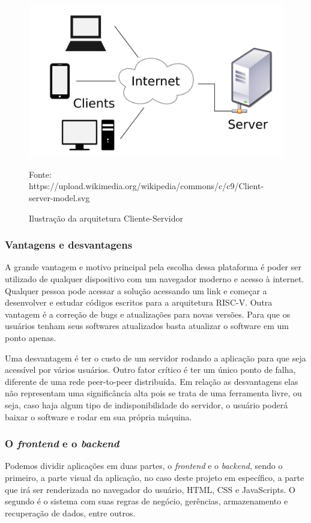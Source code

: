 		\begin{figure}
		  \includegraphics[width=\linewidth]{img/client-server-model.png}
		  \caption{Ilustração da arquitetura Cliente-Servidor}
		  Fonte: https://upload.wikimedia.org/wikipedia/commons/c/c9/Client-server-model.svg
		  \label{fig:client-server-model}
		\end{figure}

		\subsubsection{Vantagens e desvantagens}

			A grande vantagem e motivo principal pela escolha dessa plataforma é poder ser utilizado de qualquer dispositivo com um navegador moderno e acesso à internet. Qualquer pessoa pode acessar a solução acessando um link e começar a desenvolver e estudar códigos escritos para a arquitetura RISC-V. 
			Outra vantagem é a correção de bugs e atualizações para novas versões. Para que os usuários tenham seus softwares atualizados basta atualizar o software em um ponto apenas.

			Uma desvantagem é ter o custo de um servidor rodando a aplicação para que seja acessível por vários usuários. Outro fator crítico é ter um único ponto de falha, diferente de uma rede peer-to-peer distribuída.
			Em relação as desvantagens elas não representam uma significância alta pois se trata de uma ferramenta livre, ou seja, caso haja algum tipo de indisponibilidade do servidor, o usuário poderá baixar o software e rodar em sua própria máquina. 


		
		\subsubsection{O \textit{frontend} e o \textit{backend}}
			Podemos dividir aplicações em duas partes, o \textit{frontend} e o \textit{backend}, sendo o primeiro, a parte visual da aplicação, no caso deste projeto em específico, a parte que irá ser renderizada no navegador do usuário, HTML, CSS e JavaScripts. O segundo é o sistema com suas regras de negócio, gerências, armazenamento e recuperação de dados, entre outros.

